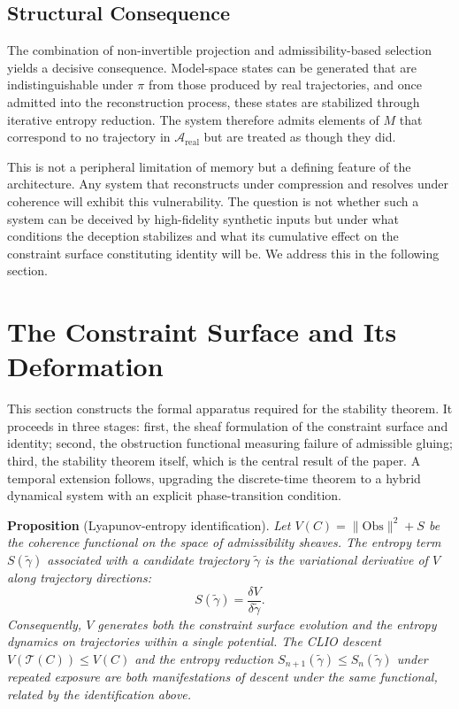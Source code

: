 \documentclass[12pt, a4paper]{article}
\begin{document}
\subsection{Structural Consequence}

The combination of non-invertible projection and admissibility-based selection yields a decisive consequence. Model-space states can be generated that are indistinguishable under $\pi$ from those produced by real trajectories, and once admitted into the reconstruction process, these states are stabilized through iterative entropy reduction. The system therefore admits elements of $M$ that correspond to no trajectory in $\mathcal{A}_{\mathrm{real}}$ but are treated as though they did.

This is not a peripheral limitation of memory but a defining feature of the architecture. Any system that reconstructs under compression and resolves under coherence will exhibit this vulnerability. The question is not whether such a system can be deceived by high-fidelity synthetic inputs but under what conditions the deception stabilizes and what its cumulative effect on the constraint surface constituting identity will be. We address this in the following section.

\section{The Constraint Surface and Its Deformation}

This section constructs the formal apparatus required for the stability theorem. It proceeds in three stages: first, the sheaf formulation of the constraint surface and identity; second, the obstruction functional measuring failure of admissible gluing; third, the stability theorem itself, which is the central result of the paper. A temporal extension follows, upgrading the discrete-time theorem to a hybrid dynamical system with an explicit phase-transition condition.

\textbf{Proposition} (Lyapunov-entropy identification). \textit{Let $V(C) = \|\mathrm{Obs}\|^2 + S$ be the coherence functional on the space of admissibility sheaves. The entropy term $S(\tilde{\gamma})$ associated with a candidate trajectory $\tilde{\gamma}$ is the variational derivative of $V$ along trajectory directions:}
\[
S(\tilde{\gamma}) = \frac{\delta V}{\delta \tilde{\gamma}}.
\]
\textit{Consequently, $V$ generates both the constraint surface evolution and the entropy dynamics on trajectories within a single potential. The CLIO descent $V(\mathcal{T}(C)) \leq V(C)$ and the entropy reduction $S_{n+1}(\tilde{\gamma}) \leq S_n(\tilde{\gamma})$ under repeated exposure are both manifestations of descent under the same functional, related by the identification above.}
\end{document}

